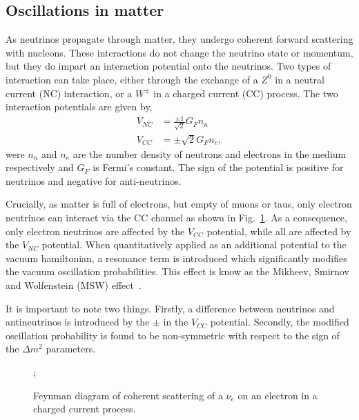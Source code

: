 \subsection{Oscillations in matter} %
\label{sec:theory_oscillations_matter} %

As neutrinos propagate through matter, they undergo coherent forward scattering with nucleons.
These interactions do not change the neutrino state or momentum, but they do impart an interaction
potential onto the neutrinos. Two types of interaction can take place, either through the exchange
of a $Z^{0}$ in a neutral current (NC) interaction, or a $W^{\pm}$ in a charged current (CC)
process. The two interaction potentials are given by,
\begin{align} %
    V_{NC} & = \frac{\pm 1}{\sqrt{2}}G_{F}n_{n} \\
    V_{CC} & = \pm\sqrt{2}G_{F}n_{e},
\end{align}
were $n_{n}$ and $n_{e}$ are the number density of neutrons and electrons in the medium
respectively and $G_{F}$ is Fermi's constant. The sign of the potential is positive for neutrinos
and negative for anti-neutrinos.

Crucially, as matter is full of electrons, but empty of muons or taus, only electron neutrinos can
interact via the CC channel as shown in Fig.~\ref{fig:coherent_scattering}. As a consequence, only
electron neutrinos are affected by the $V_{CC}$ potential, while all are affected by the $V_{NC}$
potential. When quantitatively applied as an additional potential to the vacuum hamiltonian, a
resonance term is introduced which significantly modifies the vacuum oscillation probabilities.
This effect is know as the Mikheev, Smirnov and Wolfenstein (MSW) effect~\cite{wolfenstein1978,
    mikheev1986}.

It is important to note two things. Firstly, a difference between neutrinos and antineutrinos is
introduced by the $\pm$ in the $V_{CC}$ potential. Secondly, the modified oscillation probability
is found to be non-symmetric with respect to the sign of the $\Delta m^{2}$ parameters.

\begin{figure} %
    ;
    \caption[scattering short]
    {Feynman diagram of coherent scattering of a $\nu_{e}$ on an electron in a charged current
        process.}
    \label{fig:coherent_scattering}
\end{figure}

